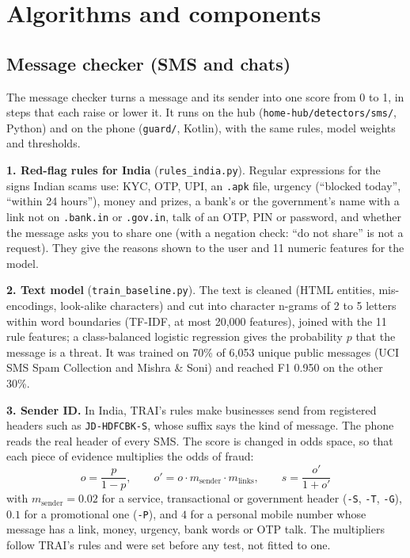 \documentclass[11pt,a4paper]{article}
\newcommand{\code}[1]{\texttt{#1}}
\begin{document}
\section{Algorithms and components}
\label{sec:algo}

\subsection{Message checker (SMS and chats)}
\label{sec:sms}

The message checker turns a message and its sender into one score from 0 to 1, in steps that each raise or
lower it. It runs on the hub (\code{home-hub/detectors/sms/}, Python) and on the phone (\code{guard/}, Kotlin), with the
same rules, model weights and thresholds.

\textbf{1. Red-flag rules for India} (\code{rules\_india.py}). Regular expressions for the signs Indian scams use:
KYC, OTP, UPI, an \code{.apk} file, urgency (``blocked today'', ``within 24 hours''), money and prizes, a bank's or
the government's name with a link not on \code{.bank.in} or \code{.gov.in}, talk of an OTP, PIN or password, and
whether the message asks you to share one (with a negation check: ``do not share'' is not a request). They give
the reasons shown to the user and 11 numeric features for the model.

\textbf{2. Text model} (\code{train\_baseline.py}). The text is cleaned (HTML entities, mis-encodings, look-alike
characters) and cut into character n-grams of 2 to 5 letters within word boundaries (TF-IDF, at most 20,000
features), joined with the 11 rule features; a class-balanced logistic regression gives the probability $p$ that
the message is a threat. It was trained on 70\% of 6,053 unique public messages (UCI SMS Spam Collection and
Mishra \& Soni) and reached F1 0.950 on the other 30\%.

\textbf{3. Sender ID.} In India, TRAI's rules make businesses send from registered headers such as
\code{JD-HDFCBK-S}, whose suffix says the kind of message. The phone reads the real header of every SMS. The
score is changed in odds space, so that each piece of evidence multiplies the odds of fraud:
\begin{equation}
  o = \frac{p}{1-p}, \qquad o' = o \cdot m_{\text{sender}} \cdot m_{\text{links}}, \qquad s = \frac{o'}{1+o'}
\end{equation}
with $m_{\text{sender}} = 0.02$ for a service, transactional or government header (\code{-S}, \code{-T},
\code{-G}), $0.1$ for a promotional one (\code{-P}), and $4$ for a personal mobile number whose message has a link,
money, urgency, bank words or OTP talk. The multipliers follow TRAI's rules and were set before any test, not
fitted to one.
\end{document}
